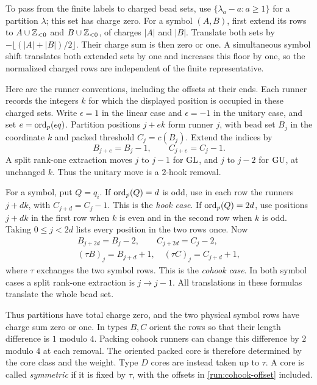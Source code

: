 To pass from the finite labels to charged bead sets, use
\(\{\lambda_a-a:a\geq1\}\) for a partition \(\lambda\);
this set has charge zero.  For a symbol \((A,B)\), first extend
its rows to \(A\cup\mathbb Z_{<0}\) and \(B\cup\mathbb Z_{<0}\), of charges
\(|A|\) and \(|B|\).  Translate both sets by
\(-\lfloor(|A|+|B|)/2\rfloor\).  Their charge sum is then zero
or one.  A simultaneous symbol shift translates both extended
sets by one and increases this floor by one, so the normalized
charged rows are independent of the finite representative.

Here are the runner conventions, including the offsets at their
ends.  Each runner records the integers \(k\) for which the
displayed position is occupied in these charged sets.
Write \(\epsilon=1\) in the linear case and \(\epsilon=-1\)
in the unitary case, and set \(e=\operatorname{ord}_p(\epsilon q)\).
Partition positions \(j+ek\) form runner \(j\), with bead set \(B_j\)
in the coordinate \(k\) and packed threshold \(C_j=c(B_j)\).
Extend the indices by
\begin{equation}\label{run:a-offset}
 B_{j+e}=B_j-1,\qquad C_{j+e}=C_j-1.
\end{equation}
A split rank-one extraction moves \(j\) to \(j-1\) for
\(\operatorname{GL}\), and \(j\) to \(j-2\) for \(\operatorname{GU}\), at unchanged \(k\).
Thus the unitary move is a \(2\)-hook removal.

For a symbol, put \(Q=q_i\).
If \(\operatorname{ord}_p(Q)=d\) is odd, use in each row the runners
\(j+dk\), with \(C_{j+d}=C_j-1\).  This is the \emph{hook case}.
If \(\operatorname{ord}_p(Q)=2d\), use positions \(j+dk\) in the first row
when \(k\) is even and in the second row when \(k\) is odd.
Taking \(0\leq j<2d\) lists every position in the two rows once.
Now
\begin{equation}\label{run:cohook-offset}
 \begin{aligned}
 B_{j+2d}=B_j-2,\qquad C_{j+2d}=C_j-2,\qquad
 \\
 (\tau B)_j=B_{j+d}+1,\quad
 (\tau C)_j=C_{j+d}+1,
 \end{aligned}
\end{equation}
where \(\tau\) exchanges the two symbol rows.
This is the \emph{cohook case}.  In both symbol cases a split
rank-one extraction is \(j\longrightarrow j-1\).
All translations in these formulas translate the whole bead set.

Thus partitions have total charge zero, and the two physical symbol
rows have charge sum zero or one.  In types \(B,C\) orient the
rows so that their length difference is \(1\) modulo \(4\).
Packing cohook runners can change this difference by \(2\) modulo
\(4\) at each removal.  The oriented packed core is therefore
determined by the core class and the weight.  Type \(D\) cores are
instead taken up to \(\tau\).  A core is called \emph{symmetric}
if it is fixed by \(\tau\), with the offsets in
\eqref{run:cohook-offset} included.

